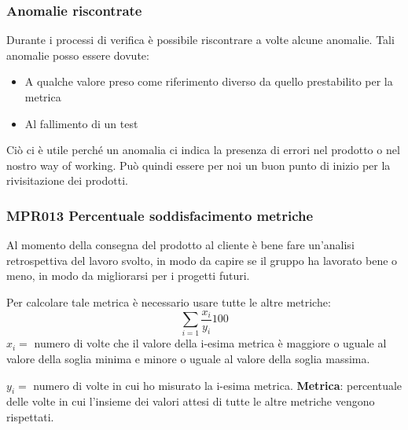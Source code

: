 		\subsubsection{Anomalie riscontrate}\label{Anomalie}
		Durante i processi di verifica è possibile riscontrare a volte alcune anomalie.
		Tali anomalie posso essere dovute:
		\begin{itemize}
			\item A qualche valore preso come riferimento diverso da quello prestabilito per la metrica
			\item Al fallimento di un test
		\end{itemize}
		Ciò ci è utile perché un anomalia ci indica la presenza di errori nel prodotto o nel nostro way of working. Può quindi essere per noi un buon punto di inizio per la rivisitazione dei prodotti.
        
        \subsubsection{MPR013 Percentuale soddisfacimento metriche}\label{percentualeSoddisfacimentoMetriche}
        Al momento della consegna del prodotto al cliente è bene fare un'analisi retrospettiva del lavoro svolto, in modo da capire se il gruppo ha lavorato bene o meno, in modo da migliorarsi per i progetti futuri. \par
        Per calcolare tale metrica è necessario usare tutte le altre metriche:
        \[{\sum_{i=1} \frac{x_i}{y_i}}100\] $x_i=$ numero di volte che il valore della i-esima metrica è maggiore o uguale al valore della soglia minima e minore o uguale al valore della soglia massima. \par
        $y_i=$ numero di volte in cui ho misurato la i-esima metrica.
        \textbf{Metrica}: percentuale delle volte in cui l'insieme dei valori attesi di tutte le altre metriche vengono rispettati.